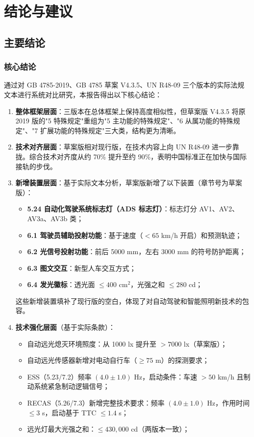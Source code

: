 \chapter{结论与建议}

\section{主要结论}

\subsection{核心结论}

通过对 GB 4785-2019、GB 4785 草案 V4.3.5、UN R48-09 三个版本的实际法规文本进行系统对比研究，本报告得出以下核心结论：

\begin{enumerate}[leftmargin=2em]
    \item \textbf{整体框架层面}：三版本在总体框架上保持高度相似性，但草案版 V4.3.5 将原 2019 版的"5 特殊规定"重组为"5 主功能的特殊规定"、"6 从属功能的特殊规定"、"7 扩展功能的特殊规定"三大类，结构更为清晰。

    \item \textbf{技术对齐层面}：草案版相对现行版，在技术内容上向 UN R48-09 进一步靠拢。综合技术对齐度从约 70\% 提升至约 90\%，表明中国标准正在加快与国际接轨的步伐。

    \item \textbf{新增装置层面}：基于实际文本分析，草案版新增了以下装置（章节号为草案版）：
    \begin{itemize}[leftmargin=2em]
        \item \textbf{5.24 自动化驾驶系统标志灯（ADS 标志灯）}：标志灯分 AV1、AV2、AV3a、AV3b 类；
        \item \textbf{6.1 驾驶员辅助投射功能}：基于速度（$< 65$ km/h 开启）和预测轨迹；
        \item \textbf{6.2 光信号投射功能}：前后 5000 mm，左右 3000 mm 的符号防护距离；
        \item \textbf{6.3 图文交互}：新型人车交互方式；
        \item \textbf{6.4 发光徽标}：透光面 $\le 400$ cm$^2$，光强之和 $\le 280$ cd；
    \end{itemize}
    这些新增装置填补了现行版的空白，体现了对自动驾驶和智能照明新技术的包容。

    \item \textbf{技术强化层面}（基于实际条款）：
    \begin{itemize}[leftmargin=2em]
        \item 自动远光熄灭环境照度：从 1000 lx 提升至 $> 7000$ lx（草案版）；
        \item 自动远光传感器新增对电动自行车（$\ge 75$ m）的探测要求；
        \item ESS（5.23/7.2）频率 $(4.0 \pm 1.0)$ Hz，启动条件：车速 $> 50$ km/h 且制动系统紧急制动逻辑信号；
        \item RECAS（5.26/7.3）新增完整技术要求：频率 $(4.0 \pm 1.0)$ Hz，作用时间 $\le 3$ s，启动基于 TTC $\le 1.4$ s；
        \item 远光灯最大光强之和：$\le 430,000$ cd（两版本一致）；
    \end{itemize}


\end{enumerate}
